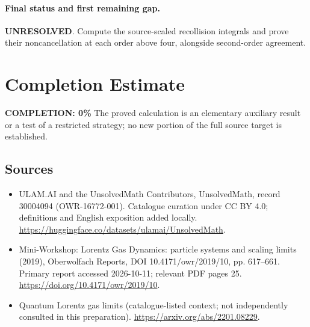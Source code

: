 \documentclass[11pt]{article}
\begin{document}
\paragraph{Final status and first remaining gap.}
\textbf{UNRESOLVED}. Compute the source-scaled recollision integrals and prove their noncancellation at each order above four, alongside second-order agreement.

\section{Completion Estimate}
\noindent\textbf{COMPLETION: 0\%}
The proved calculation is an elementary auxiliary result or a test of a restricted strategy; no new portion of the full source target is established.

\subsection{Sources}
\begin{itemize}
\item[\hypertarget{source:30004094:1}{S1}] ULAM.AI and the UnsolvedMath Contributors, UnsolvedMath, record 30004094 (OWR-16772-001). Catalogue curation under CC BY 4.0; definitions and English exposition added locally.
\url{https://huggingface.co/datasets/ulamai/UnsolvedMath}.
\item[\hypertarget{source:30004094:2}{S2}] Mini-Workshop: Lorentz Gas Dynamics: particle systems and scaling limits (2019), Oberwolfach Reports, DOI 10.4171/owr/2019/10, pp. 617--661. Primary report accessed 2026-10-11; relevant PDF pages 25.
\url{https://doi.org/10.4171/owr/2019/10}.
\item[\hypertarget{source:30004094:3}{S3}] Quantum Lorentz gas limits (catalogue-listed context; not independently consulted in this preparation).
\url{https://arxiv.org/abs/2201.08229}.
\end{itemize}
\label{end:30004094}
\end{document}
